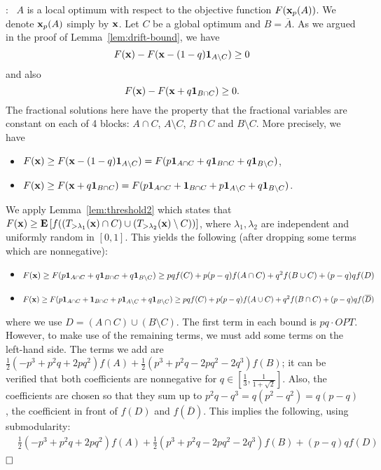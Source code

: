 \documentclass{article}[11pt]
\newcommand{\E}[1]{{\bf{E}}\left[#1\right]}
\renewenvironment{proof}{\noindent{\bf Proof}:~}{$\hfill \Box$\\}
\def\b1{{\bf 1}}
\def\bx{{\bf x}}
\begin{document}
\iffalse
\begin{proof}
$A$ is a local optimum with respect to the objective function $F(\bx_p(A))$.
We denote $\bx_p(A)$ simply by $\bx$. Let $C$ be a global optimum and $B = \overline{A}$.
As we argued in the proof of Lemma~\ref{lem:drift-bound}, we have
$$ F(\bx) - F(\bx - (1-q) \b1_{A \setminus C}) \geq 0 $$
and also
$$ F(\bx) - F(\bx + q \b1_{B \cap C}) \geq 0.$$
The fractional solutions here have the property that the fractional variables are constant
on each of 4 blocks: $A \cap C$, $A \setminus C$, $B \cap C$ and $B \setminus C$.
More precisely, we have
\begin{itemize}
\item $F(\bx) \geq F(\bx - (1-q) \b1_{A \setminus C}) =
 F(p \b1_{A \cap C} + q \b1_{B \cap C} + q \b1_{B \setminus C})$,
\item $F(\bx) \geq F(\bx + q \b1_{B \cap C}) =
 F(p \b1_{A \cap C} + \b1_{B \cap C} + p \b1_{A \setminus C} + q \b1_{B \setminus C})$.
\end{itemize}
We apply Lemma~\ref{lem:threshold2} which states that
$F(\bx) \geq \E{f((T_{>\lambda_1}(\bx) \cap C) \cup (T_{>\lambda_2}(\bx) \setminus C))}$,
where $\lambda_1, \lambda_2$ are independent and uniformly random in $[0,1]$.
This yields the following (after dropping some terms which are nonnegative):
\begin{itemize}
\item $F(\bx) \geq F(p \b1_{A \cap C} + q \b1_{B \cap C} + q \b1_{B \setminus C})
 \geq pq f(C) + p(p-q) f(A \cap C) + q^2 f(B \cup C) + (p-q) q f(D)$
\item $F(\bx) \geq F(p \b1_{A \cap C} + \b1_{B \cap C} + p \b1_{A \setminus C} + q \b1_{B \setminus C})
 \geq pq f(C) + p(p-q) f(A \cup C) + q^2 f(B \cap C) + (p-q) q f(\overline{D})$
\end{itemize}
where we use $D = (A \cap C) \cup (B \setminus C)$. The first term in each bound is $pq \cdot OPT$.
However, to make use of the remaining terms, we must add some terms on the left-hand side.
The terms we add are $\frac12 (-p^3 + p^2 q + 2pq^2) f(A) + \frac12 (p^3 + p^2 q -2pq^2 -2q^3) f(B)$;
it can be verified that both coefficients are nonnegative for $q \in [\frac13, \frac{1}{1+\sqrt{2}}]$.
Also, the coefficients are chosen so that they sum up to $p^2 q - q^3 = q (p^2 - q^2) = q (p-q)$,
the coefficient in front of $f(D)$ and $f(\overline{D})$. This implies the following, using submodularity:
\begin{eqnarray*}
 & \frac12 (-p^3 + p^2 q + 2pq^2) f(A) + \frac12 (p^3 + p^2 q -2pq^2 -2q^3) f(B) + (p-q)q f(D) \\

\end{eqnarray*}
\end{proof}
\end{document}
